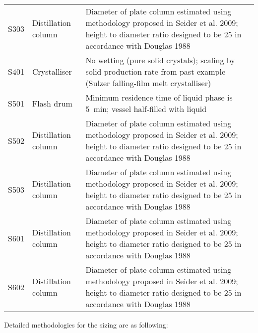 \begin{table}[h]
\begin{tabularx}{\linewidth}{llXl}
S303 & Distillation column  & Diameter of plate column estimated using methodology proposed in Seider et al. 2009; height to diameter ratio designed to be 25 in accordance with Douglas 1988 & \cite{seider_product_2009,douglas_conceptual_1988} \\
S401 & Crystalliser         & No wetting (pure solid crystals); scaling by solid production rate from past example (Sulzer falling-film melt crystalliser)                                    & \cite{seader_separation_2011}                      \\
S501 & Flash drum           & Minimum residence time of liquid phase is \SI{5}{\minute}; vessel half-filled with liquid                                                                                 & \cite{seader_separation_2011}                      \\
S502 & Distillation column  & Diameter of plate column estimated using methodology proposed in Seider et al. 2009; height to diameter ratio designed to be 25 in accordance with Douglas 1988 & \cite{seider_product_2009,douglas_conceptual_1988} \\
S503 & Distillation column  & Diameter of plate column estimated using methodology proposed in Seider et al. 2009; height to diameter ratio designed to be 25 in accordance with Douglas 1988 & \cite{seider_product_2009,douglas_conceptual_1988} \\
S601 & Distillation  column & Diameter of plate column estimated using methodology proposed in Seider et al. 2009; height to diameter ratio designed to be 25 in accordance with Douglas 1988 & \cite{seider_product_2009,douglas_conceptual_1988} \\
S602 & Distillation  column & Diameter of plate column estimated using methodology proposed in Seider et al. 2009; height to diameter ratio designed to be 25 in accordance with Douglas 1988 & \cite{seider_product_2009,douglas_conceptual_1988} \\ \bottomrule
\end{tabularx}
\end{table}

\noindent Detailed methodologies for the sizing are as following:

